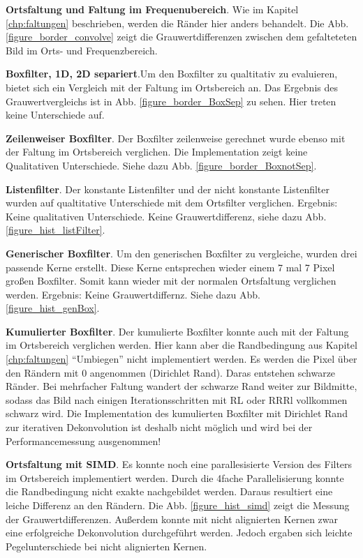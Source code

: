 \documentclass[a4paper,12pt]{article}
\begin{document}
\textbf{Ortsfaltung und Faltung im Frequenubereich}. Wie im
Kapitel \ref{chp:faltungen} beschrieben, werden die Ränder hier anders
behandelt. Die Abb. \ref{figure_border_convolve} zeigt die Grauwertdifferenzen
zwischen dem gefalteteten Bild im Orts- und Frequenzbereich. 

\textbf{Boxfilter, 1D, 2D separiert}.Um den Boxfilter zu qualtitativ zu
evaluieren, bietet sich ein Vergleich mit der Faltung im Ortsbereich an.
Das Ergebnis des Grauwertvergleichs ist in Abb. \ref{figure_border_BoxSep} zu sehen. Hier treten
keine Unterschiede auf. 

\textbf{Zeilenweiser Boxfilter}. Der Boxfilter zeilenweise gerechnet wurde
ebenso mit der Faltung im Ortsbereich verglichen. Die
Implementation zeigt keine Qualitativen Unterschiede. Siehe dazu Abb. \ref{figure_border_BoxnotSep}.

\textbf{Listenfilter}. Der konstante Listenfilter und der nicht konstante
Listenfilter wurden auf qualtitative Unterschiede mit dem Ortsfilter verglichen.
Ergebnis: Keine qualitativen Unterschiede. Keine Grauwertdifferenz, siehe dazu
Abb. \ref{figure_hist_listFilter}.

\textbf{Generischer Boxfilter}. Um den generischen Boxfilter zu vergleiche,
wurden drei passende Kerne erstellt. Diese Kerne entsprechen wieder einem 7 mal
7 Pixel großen Boxfilter. Somit kann wieder mit der normalen Ortsfaltung
verglichen werden. Ergebnis: Keine Grauwertdiffernz. Siehe dazu Abb.
\ref{figure_hist_genBox}.

\textbf{Kumulierter Boxfilter}. Der kumulierte Boxfilter konnte auch mit der
Faltung im Ortsbereich verglichen werden. Hier kann aber die Randbedingung aus
Kapitel \ref{chp:faltungen} "`Umbiegen"' nicht implementiert werden. Es werden
die Pixel über den Rändern mit 0 angenommen (Dirichlet Rand). Daras entstehen
schwarze Ränder. Bei mehrfacher Faltung wandert der schwarze Rand weiter zur
Bildmitte, sodass das Bild nach einigen Iterationsschritten mit RL oder RRRl
vollkommen schwarz wird. Die Implementation des kumulierten Boxfilter mit Dirichlet Rand
zur iterativen Dekonvolution ist deshalb nicht möglich und wird bei der
Performancemessung ausgenommen!

\textbf{Ortsfaltung mit SIMD}. Es konnte noch eine parallesisierte
Version des Filters im Ortsbereich implementiert werden. Durch die 4fache
Parallelisierung konnte die Randbedingung nicht exakte nachgebildet werden.
Daraus resultiert eine leiche Differenz an den Rändern. Die Abb. \ref{figure_hist_simd} zeigt
die Messung der Grauwertdifferenzen. Außerdem konnte mit nicht alignierten
Kernen zwar eine erfolgreiche Dekonvolution durchgeführt werden. Jedoch ergaben
sich leichte Pegelunterschiede bei nicht alignierten Kernen.
\end{document}
